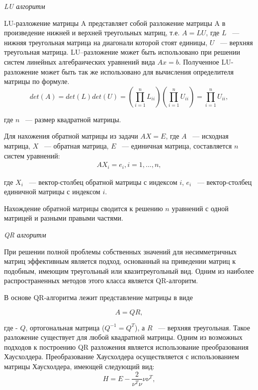 \textit{LU алгоритм}

LU-разложение матрицы A представляет собой разложение матрицы A в
произведение нижней и верхней треугольных матриц, т.е. $A = LU$, где $L$ ~--- нижняя треугольная матрица на диагонали которой
стоят единицы, $U$ ~--- верхняя
треугольная матрица. LU–разложение может быть использовано при решении
систем линейных алгебраических уравнений вида $Ax = b$. Полученное LU-разложение может быть так же использовано для вычисления определителя
матрицы по формуле.
\begin{equation}
    det(A) = det(L)det(U) = (\prod\limits_{i = 1}^nL_{ii})(\prod\limits_{i = 1}^nU_{ii}) = \prod\limits_{i = 1}^nU_{ii},
    \label{eq:Det}
\end{equation}

где $n$ ~--- размер квадратной матрицы.

Для нахожения обратной матрицы из задачи $AX = E$, где $A$ ~--- исходная матрица, $X$ ~--- обратная матрица, $E$ ~--- единичная
матрица, составляется $n$ систем уравнений:
\begin{equation}
    \begin{gathered}
        AX_i = e_i,  i = 1, ..., n,
    \end{gathered}
    \label{eq:Reverse}
\end{equation}

где $X_i$ ~--- вектор-столбец обратной матрицы с индексом $i$, $e_i$ ~--- вектор-столбец единичной матрицы с индексом $i$.

Нахождение обратной матрицы сводится к решению $n$ уравнений с одной матрицей и разными правыми частями.

\textit{QR алгоритм}

При решении полной проблемы собственных значений для несимметричных
матриц эффективным является подход, основанный на приведении матриц к подобным, 
имеющим треугольный или квазитреугольный вид. Одним из наиболее распространенных
методов этого класса является QR-алгоритм.

В основе QR-алгоритма лежит представление матрицы в виде

\begin{equation}
A = QR,
\label{eq:QRCommon1}
\end{equation}

где - $Q$, ортогональная матрица ($Q^{-1} = Q^T$), а
$R$ ~--- верхняя треугольная. Такое разложение
существует для любой квадратной матрицы. Одним из возможных подходов к построению
QR разложения является использование преобразования Хаусхолдера. Преобразование Хаусхолдера осуществляется с использованием 
матрицы
Хаусхолдера, имеющей следующий вид:
\begin{equation}
    H = E - \dfrac{2}{\nu^T\nu}\nu\nu^T,
    \label{eq:QRCommon2}
\end{equation}

